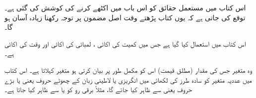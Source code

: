 
اس کتاب میں مستعمل حقائق کو اس باب میں اکٹھے کرنے کی کوشش کی گئی ہے۔ توقع کی جاتی ہے کہ یوں کتاب پڑھتے وقت اصل مضمون پر توجہ رکھنا زیادہ آسان ہو گا۔

اس کتاب میں   استعمال کیا گیا ہے جس میں کمیت کی اکائی ،  لمبائی کی اکائی  اور وقت کی اکائی  ہے۔

وہ متغیر جس کی مقدار (مطلق قیمت) اس کو مکمل طور پر بیان کرتی ہو    متغیر کہلاتا ہے۔ اس کتاب میں عددیہ متغیر کو سادہ طرز کی لکھائی میں انگریزی یا لاطینی زبان کے چھوٹے حروف  یعنی   یا بڑے حروف یعنی   سے ظاہر کیا جائے گا، مثلاً برقی رو کو  یا  سے ظاہر کیا جاتا ہے۔

